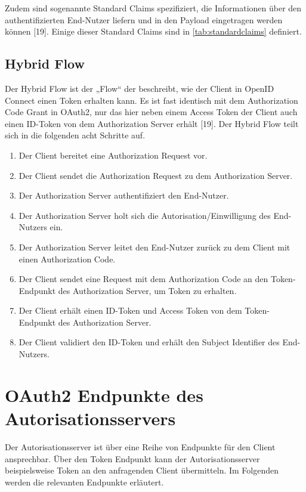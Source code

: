 Zudem sind sogenannte Standard Claims spezifiziert, die Informationen über den 
authentifizierten End-Nutzer liefern und in den Payload eingetragen werden können [19].  
Einige dieser Standard Claims sind in \autoref{tab:standardclaims} definiert. 

\subsection{Hybrid Flow}
\label{subsec:OpenIDConnect:HybridFlow}
Der Hybrid Flow ist der „Flow“ der beschreibt, wie der Client in OpenID Connect einen
Token erhalten kann. Es ist fast identisch mit dem Authorization Code Grant in OAuth2, nur 
das hier neben einem Access Token der Client auch einen ID-Token von dem Authorization 
Server erhält [19]. Der Hybrid Flow teilt sich in die folgenden acht Schritte auf.
\begin{enumerate}
  \item Der Client bereitet eine Authorization Request vor.
  \item Der Client sendet die Authorization Request zu dem Authorization Server.
  \item Der Authorization Server authentifiziert den End-Nutzer. 
  \item Der Authorization Server holt sich die Autorisation/Einwilligung des End-Nutzers ein. 
  \item Der Authorization Server leitet den End-Nutzer zurück zu dem Client mit 
  einen Authorization Code.
  \item Der Client sendet eine Request mit dem Authorization Code an den Token-Endpunkt des Authorization Server, um Token zu erhalten. 
  \item Der Client erhält einen ID-Token und Access Token von dem Token-Endpunkt des Authorization Server.
  \item Der Client validiert den ID-Token und erhält den Subject Identifier des End-Nutzers.    
\end{enumerate}

\section{OAuth2 Endpunkte des Autorisationsservers}
\label{sec:OAuth2EndpunktedesAutorisationsservers}

Der Autorisationsserver ist über eine Reihe von Endpunkte für den Client ansprechbar. Über den Token 
Endpunkt kann der Autorisationsserver beispielsweise Token an den anfragenden Client 
übermitteln. Im Folgenden werden die relevanten Endpunkte erläutert.

